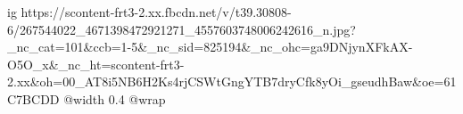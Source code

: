  
 
 
 
 

\ifcmt
  ig https://scontent-frt3-2.xx.fbcdn.net/v/t39.30808-6/267544022_4671398472921271_4557603748006242616_n.jpg?_nc_cat=101&ccb=1-5&_nc_sid=825194&_nc_ohc=ga9DNjynXFkAX-O5O_x&_nc_ht=scontent-frt3-2.xx&oh=00_AT8i5NB6H2Ks4rjCSWtGngYTB7dryCfk8yOi_gseudhBaw&oe=61C7BCDD
  @width 0.4
  @wrap 
\fi
